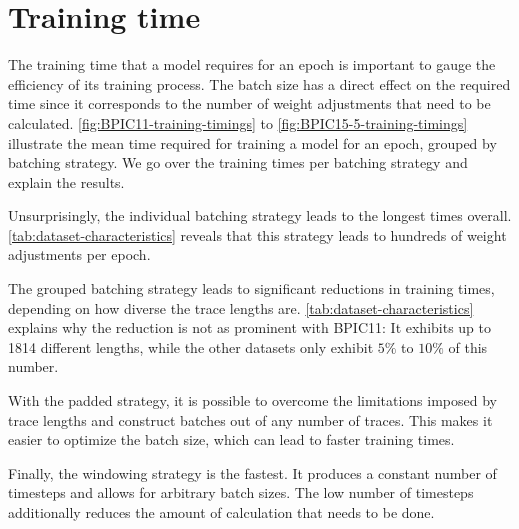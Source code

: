 \section{Training time}\label{sec:eval:training-time}
The training time that a model requires for an epoch is important to gauge the efficiency of its training process. The batch size has a direct effect on the required time since it corresponds to the number of weight adjustments that need to be calculated. \autoref{fig:BPIC11-training-timings} to \autoref{fig:BPIC15-5-training-timings} illustrate the mean time required for training a model for an epoch, grouped by batching strategy. We go over the training times per batching strategy and explain the results.

Unsurprisingly, the individual batching strategy leads to the longest times overall. \autoref{tab:dataset-characteristics} reveals that this strategy leads to hundreds of weight adjustments per epoch.

The grouped batching strategy leads to significant reductions in training times, depending on how diverse the trace lengths are. \autoref{tab:dataset-characteristics} explains why the reduction is not as prominent with BPIC11: It exhibits up to 1814 different lengths, while the other datasets only exhibit $5\%$ to $10\%$ of this number.

With the padded strategy, it is possible to overcome the limitations imposed by trace lengths and construct batches out of any number of traces. This makes it easier to optimize the batch size, which can lead to faster training times.

Finally, the windowing strategy is the fastest.
It produces a constant number of timesteps and allows for arbitrary batch sizes.
The low number of timesteps additionally reduces the amount of calculation that needs to be done.

